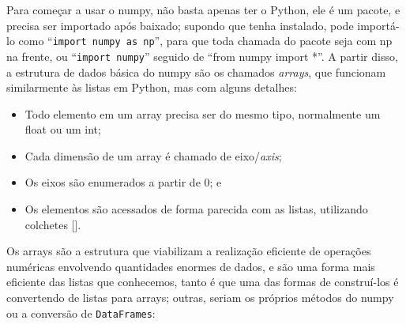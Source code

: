 \documentclass[../numerical_methods.tex]{subfiles}
\begin{document}
Para começar a usar o numpy, não basta apenas ter o Python, ele é um pacote, e precisa ser importado após baixado; supondo que tenha instalado, pode importá-lo como ``\texttt{import numpy as np}'', para que toda chamada do pacote seja com np na frente, ou ``\texttt{import numpy}'' seguido de ``from numpy import *''.
A partir disso, a estrutura de dados básica do numpy são os chamados \textit{arrays}, que funcionam similarmente às listas em Python, mas com alguns detalhes:
\begin{itemize}
	\item Todo elemento em um array precisa ser do mesmo tipo, normalmente um float ou um int;
	\item Cada dimensão de um array é chamado de eixo/\textit{axis};
	\item Os eixos são enumerados a partir de 0; e
	\item Os elementos são acessados de forma parecida com as listas, utilizando colchetes [].
\end{itemize}
Os arrays são a estrutura que viabilizam a realização eficiente de operações numéricas envolvendo quantidades enormes de dados, e são uma forma mais eficiente das listas que conhecemos, tanto é que uma das formas de construí-los é convertendo de listas para arrays; outras, seriam os próprios métodos do numpy ou a conversão de \texttt{DataFrames}:
\end{document}
